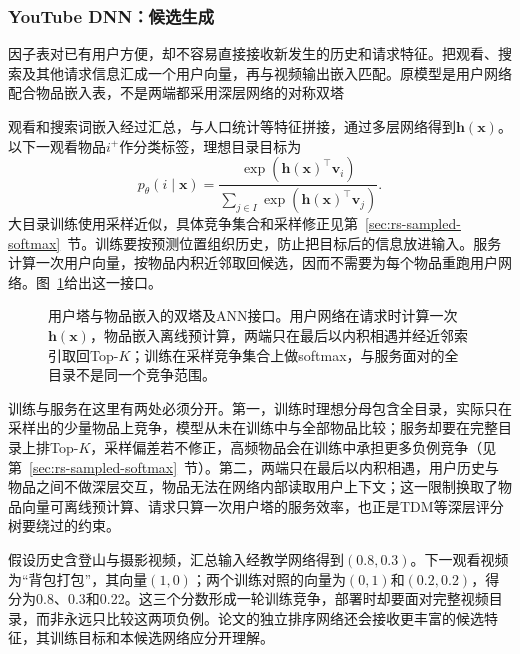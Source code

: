 \subsubsection{YouTube DNN：候选生成}
\label{sec:rs-youtube-candidate}

因子表对已有用户方便，却不容易直接接收新发生的历史和请求特征。把观看、搜索及其他请求信息汇成一个用户向量，再与视频输出嵌入匹配。原模型是用户网络配合物品嵌入表，不是两端都采用深层网络的对称双塔

观看和搜索词嵌入经过汇总，与人口统计等特征拼接，通过多层网络得到$\bm h(\bm x)$。以下一观看物品$i^+$作分类标签，理想目录目标为
\begin{equation}
 p_\theta(i\mid\bm x)=
 \frac{\exp(\bm h(\bm x)^\top\bm v_i)}
 {\sum_{j\in I}\exp(\bm h(\bm x)^\top\bm v_j)}.
 \label{eq:rs-directory-softmax}
\end{equation}
大目录训练使用采样近似，具体竞争集合和采样修正见第~\ref{sec:rs-sampled-softmax}~节。训练要按预测位置组织历史，防止把目标后的信息放进输入。服务计算一次用户向量，按物品内积近邻取回候选，因而不需要为每个物品重跑用户网络。图~\ref{fig:rs-two-tower-ann}给出这一接口。

\begin{figure}[htbp]
 \centering
 
 \caption{用户塔与物品嵌入的双塔及ANN接口。用户网络在请求时计算一次$\bm h(\bm x)$，物品嵌入离线预计算，两端只在最后以内积相遇并经近邻索引取回Top-$K$；训练在采样竞争集合上做softmax，与服务面对的全目录不是同一个竞争范围。}
 \label{fig:rs-two-tower-ann}
\end{figure}

训练与服务在这里有两处必须分开。第一，训练时理想分母包含全目录，实际只在采样出的少量物品上竞争，模型从未在训练中与全部物品比较；服务却要在完整目录上排Top-$K$，采样偏差若不修正，高频物品会在训练中承担更多负例竞争（见第~\ref{sec:rs-sampled-softmax}~节）。第二，两端只在最后以内积相遇，用户历史与物品之间不做深层交互，物品无法在网络内部读取用户上下文；这一限制换取了物品向量可离线预计算、请求只算一次用户塔的服务效率，也正是TDM等深层评分树要绕过的约束。

假设历史含登山与摄影视频，汇总输入经教学网络得到$(0.8,0.3)$。下一观看视频为“背包打包”，其向量$(1,0)$；两个训练对照的向量为$(0,1)$和$(0.2,0.2)$，得分为0.8、0.3和0.22。这三个分数形成一轮训练竞争，部署时却要面对完整视频目录，而非永远只比较这两项负例。论文的独立排序网络还会接收更丰富的候选特征，其训练目标和本候选网络应分开理解。

